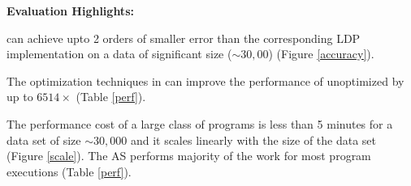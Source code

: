 \textbf{Evaluation Highlights:}
\squishlist \item \system can achieve upto 2 orders of smaller error than the corresponding
\textsf{LDP} implementation on a data of significant size ($\sim 30,00$) (Figure \ref{accuracy}).
\item The optimization techniques in \system can improve the performance
of unoptimized \system by up to $6514\times$ (Table \ref{perf}).
\item The performance cost of a large class of \system programs is
less than 5 minutes for a data set of size $\sim 30,000$  and it scales linearly with the size of the data set (Figure \ref{scale}). The \textsf{AS} performs majority of the work for most program executions (Table \ref{perf}).
\squishend
